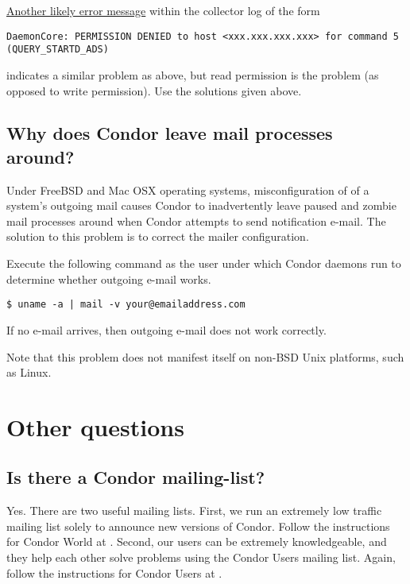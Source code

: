 \underline{Another likely error message} within the collector log of the form
\footnotesize
\begin{verbatim}
DaemonCore: PERMISSION DENIED to host <xxx.xxx.xxx.xxx> for command 5 (QUERY_STARTD_ADS)
\end{verbatim}
\normalsize
indicates a similar problem as above, but read permission
is the problem (as opposed to write permission).
Use the solutions given above.

\subsection*{Why does Condor leave mail processes around?}

Under FreeBSD and Mac OSX operating systems,
misconfiguration of of a system's outgoing mail causes
Condor to inadvertently leave paused and zombie mail
processes around when Condor attempts to send notification e-mail.
The solution to this problem is
to correct the mailer configuration.

Execute the following command as the user under which Condor
daemons run to determine whether outgoing e-mail works.

\begin{verbatim}
$ uname -a | mail -v your@emailaddress.com
\end{verbatim}

If no e-mail arrives, then outgoing e-mail does not work
correctly.

Note that this problem does not manifest itself
on non-BSD Unix platforms, such as Linux.

\section{Other questions}


\subsection*{Is there a Condor mailing-list?}

Yes. There are two useful mailing lists.
First, we run an extremely low traffic mailing list solely to announce new
versions of Condor.
Follow the instructions for Condor World at
.
Second, our users can be extremely knowledgeable,
and they help each other solve problems
using the Condor Users mailing list.
Again, follow the instructions for Condor Users at
.



